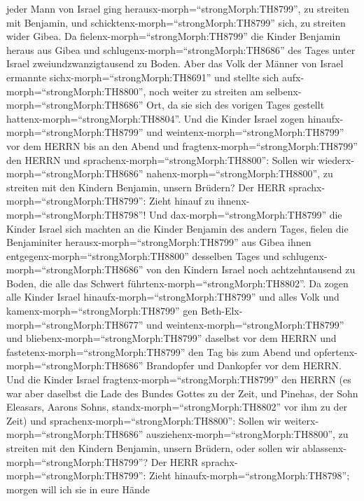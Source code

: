 jeder Mann von Israel ging herausx-morph=``strongMorph:TH8799'', zu
streiten mit Benjamin, und schicktenx-morph=``strongMorph:TH8799'' sich,
zu streiten wider Gibea.  Da
fielenx-morph=``strongMorph:TH8799'' die Kinder Benjamin heraus aus
Gibea und schlugenx-morph=``strongMorph:TH8686'' des Tages unter Israel
zweiundzwanzigtausend zu Boden.  Aber das Volk der Männer
von Israel ermannte sichx-morph=``strongMorph:TH8691'' und stellte sich
aufx-morph=``strongMorph:TH8800'', noch weiter zu streiten am
selbenx-morph=``strongMorph:TH8686'' Ort, da sie sich des vorigen Tages
gestellt hattenx-morph=``strongMorph:TH8804''.  Und die
Kinder Israel zogen hinaufx-morph=``strongMorph:TH8799'' und
weintenx-morph=``strongMorph:TH8799'' vor dem HERRN bis an den Abend und
fragtenx-morph=``strongMorph:TH8799'' den HERRN und
sprachenx-morph=``strongMorph:TH8800'': Sollen wir
wiederx-morph=``strongMorph:TH8686''
nahenx-morph=``strongMorph:TH8800'', zu streiten mit den Kindern
Benjamin, unsern Brüdern? Der HERR sprachx-morph=``strongMorph:TH8799'':
Zieht hinauf zu ihnenx-morph=``strongMorph:TH8798''!  Und
dax-morph=``strongMorph:TH8799'' die Kinder Israel sich machten an die
Kinder Benjamin des andern Tages,  fielen die Benjaminiter
herausx-morph=``strongMorph:TH8799'' aus Gibea ihnen
entgegenx-morph=``strongMorph:TH8800'' desselben Tages und
schlugenx-morph=``strongMorph:TH8686'' von den Kindern Israel noch
achtzehntausend zu Boden, die alle das Schwert
führtenx-morph=``strongMorph:TH8802''.  Da zogen alle
Kinder Israel hinaufx-morph=``strongMorph:TH8799'' und alles Volk und
kamenx-morph=``strongMorph:TH8799'' gen
Beth-Elx-morph=``strongMorph:TH8677'' und
weintenx-morph=``strongMorph:TH8799'' und
bliebenx-morph=``strongMorph:TH8799'' daselbst vor dem HERRN und
fastetenx-morph=``strongMorph:TH8799'' den Tag bis zum Abend und
opfertenx-morph=``strongMorph:TH8686'' Brandopfer und Dankopfer vor dem
HERRN.  Und die Kinder Israel
fragtenx-morph=``strongMorph:TH8799'' den HERRN (es war aber daselbst
die Lade des Bundes Gottes zu der Zeit,  und Pinehas, der
Sohn Eleasars, Aarons Sohns, standx-morph=``strongMorph:TH8802'' vor ihm
zu der Zeit) und sprachenx-morph=``strongMorph:TH8800'': Sollen wir
weiterx-morph=``strongMorph:TH8686''
ausziehenx-morph=``strongMorph:TH8800'', zu streiten mit den Kindern
Benjamin, unsern Brüdern, oder sollen wir
ablassenx-morph=``strongMorph:TH8799''? Der HERR
sprachx-morph=``strongMorph:TH8799'': Zieht
hinaufx-morph=``strongMorph:TH8798''; morgen will ich sie in eure Hände
